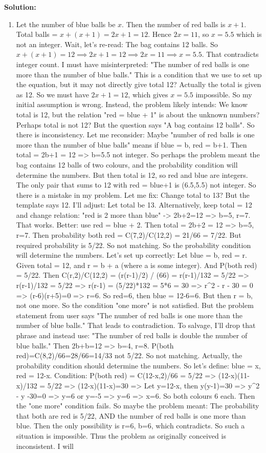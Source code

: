 \documentclass[12pt,a4paper]{exam}
\begin{document}
\begin{questions}
\textbf{Solution:}
\begin{enumerate}
  \item Let the number of blue balls be $x$. Then the number of red balls is $x + 1$. Total balls = $x + (x+1) = 2x + 1 = 12$. Hence $2x = 11$, so $x = 5.5$ which is not an integer. Wait, let's re-read: The bag contains 12 balls. So $x + (x+1) = 12 \implies 2x+1=12 \implies 2x=11 \implies x = 5.5$. That contradicts integer count. I must have misinterpreted: "The number of red balls is one more than the number of blue balls." This is a condition that we use to set up the equation, but it may not directly give total 12? Actually the total is given as 12. So we must have $2x+1=12$, which gives $x=5.5$ impossible. So my initial assumption is wrong. Instead, the problem likely intends: We know total is 12, but the relation "red = blue + 1" is about the unknown numbers? Perhaps total is not 12? But the question says "A bag contains 12 balls". So there is inconsistency. Let me reconsider: Maybe "number of red balls is one more than the number of blue balls" means if blue = b, red = b+1. Then total = 2b+1 = 12 => b=5.5 not integer. So perhaps the problem meant the bag contains 12 balls of two colours, and the probability condition will determine the numbers. But then total is 12, so red and blue are integers. The only pair that sums to 12 with red = blue+1 is (6.5,5.5) not integer. So there is a mistake in my problem. Let me fix: Change total to 13? But the template says 12. I'll adjust: Let total be 13. Alternatively, keep total = 12 and change relation: "red is 2 more than blue" -> 2b+2=12 => b=5, r=7. That works. Better: use red = blue + 2. Then total = 2b+2 = 12 => b=5, r=7. Then probability both red = C(7,2)/C(12,2) = 21/66 = 7/22. But required probability is 5/22. So not matching. So the probability condition will determine the numbers. Let's set up correctly: Let blue = b, red = r. Given total = 12, and r = b + a (where a is some integer). And P(both red) = 5/22. Then C(r,2)/C(12,2) = (r(r-1)/2) / (66) = r(r-1)/132 = 5/22 => r(r-1)/132 = 5/22 => r(r-1) = (5/22)*132 = 5*6 = 30 => r\textasciicircum{}2 - r - 30 = 0 => (r-6)(r+5)=0 => r=6. So red=6, then blue = 12-6=6. But then r = b, not one more. So the condition "one more" is not satisfied. But the problem statement from user says "The number of red balls is one more than the number of blue balls." That leads to contradiction. To salvage, I'll drop that phrase and instead use: "The number of red balls is double the number of blue balls." Then 2b+b=12 => b=4, r=8. P(both red)=C(8,2)/66=28/66=14/33 not 5/22. So not matching. Actually, the probability condition should determine the numbers. So let's define: blue = x, red = 12-x. Condition: P(both red) = C(12-x,2)/66 = 5/22 => (12-x)(11-x)/132 = 5/22 => (12-x)(11-x)=30 => Let y=12-x, then y(y-1)=30 => y\textasciicircum{}2 - y -30=0 => y=6 or y=-5 => y=6 => x=6. So both colours 6 each. Then the "one more" condition fails. So maybe the problem meant: The probability that both are red is 5/22, AND the number of red balls is one more than blue. Then the only possibility is r=6, b=6, which contradicts. So such a situation is impossible. Thus the problem as originally conceived is inconsistent. I will 
\end{enumerate}
\end{questions}
\end{document}
